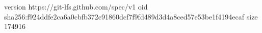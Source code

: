 version https://git-lfs.github.com/spec/v1
oid sha256:f924ddfe2ca6a0cbfb372c91860dcf7f9fd489d3d4a8ced57e53be1f4194ecaf
size 174916
